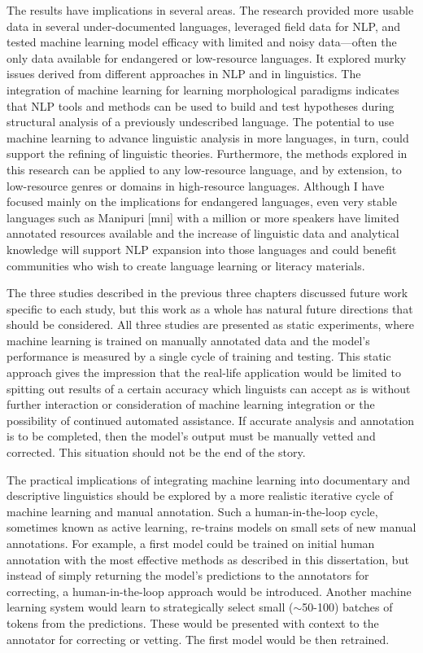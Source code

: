 The results have implications in several areas. The research provided more usable data in several under-documented languages, leveraged field data for NLP, and tested machine learning model efficacy with limited and noisy data---often the only data available for endangered or low-resource languages. It explored murky issues derived from different approaches in NLP and in linguistics. 
The integration of machine learning for learning morphological paradigms indicates that NLP tools and methods can be used to build and test hypotheses during structural analysis of a previously undescribed language. The potential to use machine learning to advance linguistic analysis in more languages, in turn, could support the refining of linguistic theories. Furthermore, the methods explored in this research can be applied to any low-resource language, and by extension, to low-resource genres or domains in high-resource languages. Although I have focused mainly on the implications for endangered languages, even very stable languages such as Manipuri [mni] with a million or more speakers have limited annotated resources available and the increase of linguistic data and analytical knowledge will support NLP expansion into those languages and could benefit communities who wish to create language learning or literacy materials. 

The three studies described in the previous three chapters discussed future work specific to each study, but this work as a whole has natural future directions that should be considered. All three studies are presented as static experiments, where machine learning is trained on manually annotated data and the model's performance is measured by a single cycle of training and testing. This static approach gives the impression that the real-life application would be limited to spitting out results of a certain accuracy which linguists can accept as is without further interaction or consideration of machine learning integration or the possibility of continued automated assistance. If accurate analysis and annotation is to be completed, then the model's output must be manually vetted and corrected. This situation should not be the end of the story. 

The practical implications of integrating machine learning into documentary and descriptive linguistics should be explored by a more realistic iterative cycle of machine learning and manual annotation. Such a human-in-the-loop cycle, sometimes known as active learning, re-trains models on small sets of new manual annotations. 
For example, a first model could be trained on initial human annotation with the most effective methods as described in this dissertation, but instead of simply returning the model's predictions to the annotators for correcting, a human-in-the-loop approach would be introduced. Another machine learning system would learn to strategically select small ($\sim$50-100) batches of tokens from the predictions. These would be presented with context to the annotator for correcting or vetting. The first model would be then retrained. 

